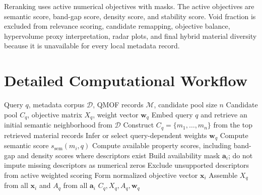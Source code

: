 \documentclass[12pt,a4paper]{article}
\begin{document}
Reranking uses active numerical objectives with masks. The active objectives are semantic score, band-gap score, density score, and stability score. Void fraction is excluded from relevance scoring, candidate remapping, objective balance, hypervolume proxy interpretation, radar plots, and final hybrid material diversity because it is unavailable for every local metadata record.

\section*{Detailed Computational Workflow}

\begin{algorithm}[H]
\caption{QMOF-Rec retrieval and objective scoring}
\begin{algorithmic}[1]
\Require Query $q$, metadata corpus $\mathcal{D}$, QMOF records $\mathcal{M}$, candidate pool size $n$
\Ensure Candidate pool $C_q$, objective matrix $X_q$, weight vector $\mathbf{w}_q$
\State Embed query $q$ and retrieve an initial semantic neighborhood from $\mathcal{D}$
\State Construct $C_q = \{m_1, \ldots, m_n\}$ from the top retrieved material records
\State Infer or select query-dependent weights $\mathbf{w}_q$
  \State Compute semantic score $s_{\mathrm{sem}}(m_i, q)$
  \State Compute available property scores, including band-gap and density scores where descriptors exist
  \State Build availability mask $\mathbf{a}_i$; do not impute missing descriptors as numerical zeros
  \State Exclude unsupported descriptors from active weighted scoring
  \State Form normalized objective vector $\mathbf{x}_i$
\EndFor
\State Assemble $X_q$ from all $\mathbf{x}_i$ and $A_q$ from all $\mathbf{a}_i$
\State \Return $C_q, X_q, A_q, \mathbf{w}_q$
\end{algorithmic}
\end{algorithm}
\end{document}
